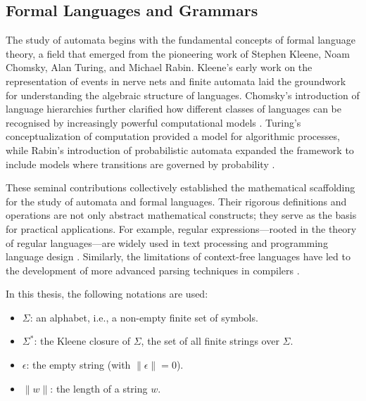 \subsection{Formal Languages and Grammars}
\label{subsec:formal-languages-and-grammars}

The study of automata begins with the fundamental concepts of formal language theory, a field that emerged from the pioneering work of Stephen Kleene, Noam Chomsky, Alan Turing, and Michael Rabin. Kleene's early work on the representation of events in nerve nets and finite automata \cite{kleene1956representation} laid the groundwork for understanding the algebraic structure of languages. Chomsky’s introduction of language hierarchies \cite{chomsky1956three} further clarified how different classes of languages can be recognised by increasingly powerful computational models \cite{sipser2013introduction}. Turing's conceptualization of computation \cite{turing1936computable} provided a model for algorithmic processes, while Rabin's introduction of probabilistic automata \cite{rabin1963probabilistic} expanded the framework to include models where transitions are governed by probability \cite{droste2009handbook}.

These seminal contributions collectively established the mathematical scaffolding for the study of automata and formal languages. Their rigorous definitions and operations are not only abstract mathematical constructs; they serve as the basis for practical applications. For example, regular expressions—rooted in the theory of regular languages—are widely used in text processing and programming language design \cite{kernighan1984unix, rozenberg1997handbook}. Similarly, the limitations of context-free languages have led to the development of more advanced parsing techniques in compilers \cite{chomsky1956three}.

\begin{notation}[Symbols]
In this thesis, the following notations are used:
\begin{itemize}
    \item $\Sigma$: an alphabet, i.e., a non-empty finite set of symbols.
    \item $\Sigma^\ast$: the Kleene closure of $\Sigma$, the set of all finite strings over $\Sigma$.
    \item $\epsilon$: the empty string (with $\|\epsilon\| = 0$).
    \item $\|w\|$: the length of a string $w$.
\end{itemize}
\end{notation}

